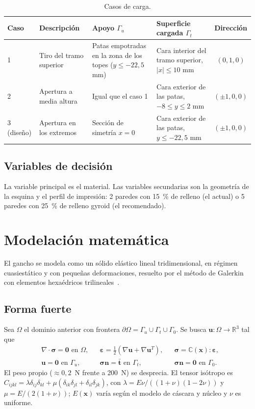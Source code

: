 \documentclass[11pt,a4paper]{article}
\begin{document}
\begin{table}[htbp]\centering\small
\caption{Casos de carga.}
\begin{tabular}{lp{2.8cm}p{3.6cm}p{3.6cm}c}\toprule
Caso & Descripción & Apoyo $\Gamma_u$ & Superficie cargada $\Gamma_t$ & Dirección\\\midrule
1 & Tiro del tramo superior & Patas empotradas en la zona de los topes ($y\le-22{,}5$ mm) & Cara interior del tramo superior, $|x|\le10$ mm & $(0,1,0)$\\
2 & Apertura a media altura & Igual que el caso 1 & Cara exterior de las patas, $-8\le y\le2$ mm & $(\pm1,0,0)$\\
3 (diseño) & Apertura en los extremos & Sección de simetría $x=0$ & Cara exterior de las patas, $y\le-22{,}5$ mm & $(\pm1,0,0)$\\\bottomrule
\end{tabular}\end{table}

\subsection{Variables de decisión}
La variable principal es el material. Las variables secundarias son la geometría de la esquina y el perfil de impresión: 2 paredes con 15~\% de relleno (el actual) o 5 paredes con 25~\% de relleno gyroid (el recomendado).

\section{Modelación matemática}
El gancho se modela como un sólido elástico lineal tridimensional, en régimen cuasiestático y con pequeñas deformaciones, resuelto por el método de Galerkin con elementos hexaédricos trilineales~\cite{zienkiewicz}.

\subsection{Forma fuerte}
Sea $\Omega$ el dominio anterior con frontera $\partial\Omega=\Gamma_u\cup\Gamma_t\cup\Gamma_0$. Se busca $\mathbf u:\Omega\to\mathbb R^3$ tal que
\begin{equation}
\begin{aligned}
&\nabla\cdot\bm\sigma = \mathbf 0 \text{ en } \Omega, &&
\bm\varepsilon = \tfrac12(\nabla\mathbf u+\nabla\mathbf u^T), &&
\bm\sigma = \mathbb C(\mathbf x):\bm\varepsilon,\\
&\mathbf u = \mathbf 0 \text{ en }\Gamma_u, &&
\bm\sigma\mathbf n = \bar{\mathbf t}\text{ en }\Gamma_t, &&
\bm\sigma\mathbf n = \mathbf 0\text{ en }\Gamma_0 .
\end{aligned}
\end{equation}
El peso propio ($\approx0{,}2$~N frente a 200~N) se desprecia. El tensor isótropo es $C_{ijkl}=\lambda\delta_{ij}\delta_{kl}+\mu(\delta_{ik}\delta_{jl}+\delta_{il}\delta_{jk})$, con $\lambda=E\nu/((1+\nu)(1-2\nu))$ y $\mu=E/(2(1+\nu))$; $E(\mathbf x)$ varía según el modelo de cáscara y núcleo y $\nu$ es uniforme.
\end{document}
